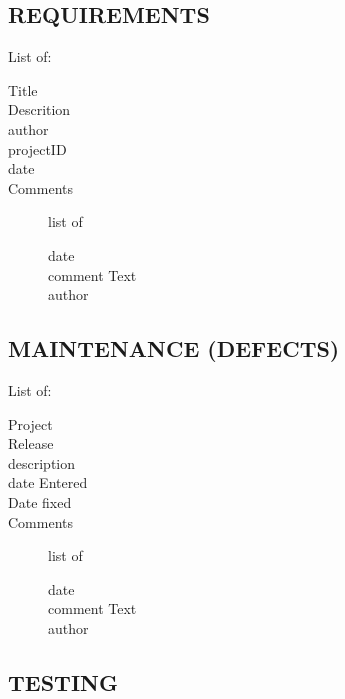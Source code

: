 \documentclass[SDSUThesis.tex]{subfiles}
\begin{document}
    \subsection{REQUIREMENTS}
    List of: 
    \begin{description}
      \item[Title] 
      \item[Descrition]
      \item[author]
      \item[projectID]
      \item[date]
      \item[Comments] list of \\
      \begin{description}
        \item[date]
        \item[comment Text]
        \item[author]
      \end{description}
    \end{description}
    
    \subsection{MAINTENANCE (DEFECTS)}
    List of:
    \begin{description}
      \item[Project] 
      \item[Release]
      \item[description]
      \item[date Entered]
      \item[Date fixed]
      \item[Comments] list of \\
      \begin{description}
        \item[date]
        \item[comment Text]
        \item[author]
      \end{description}
    \end{description}
    
    
    
    \subsection{TESTING}
    
\end{document}
